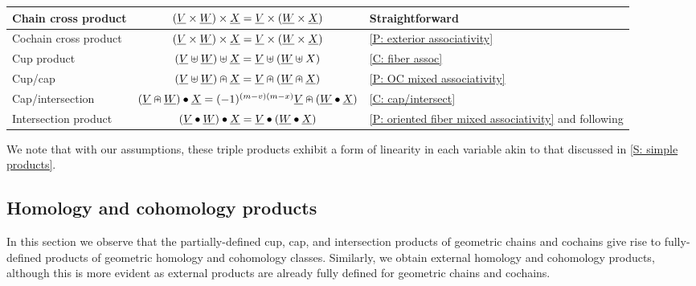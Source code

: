 \begin{center}
	\begin{tabular}{|l|c|l|}
		\hline
		Chain cross product& $(\underline{V} \times \underline{W}) \times \underline{X} = \underline{V} \times (\underline{W} \times \underline{X})$&Straightforward\\
		\hline
		Cochain cross product& $(\underline{V} \times \underline{W}) \times \underline{X} = \underline{V} \times (\underline{W} \times \underline{X})$&\cref{P: exterior associativity}\\
		\hline
		Cup product &$(\underline{V}\uplus \underline{W})\uplus\underline{X} = \underline{V}\uplus(\underline{W}\uplus X)$&\cref{C: fiber assoc} \\
		\hline
		Cup/cap & $(\underline{V} \uplus \underline{W})\nplus \underline{X} = \underline{V}\nplus(\underline{W}\nplus\underline{X})$& \cref{P: OC mixed associativity}\\
		\hline
		Cap/intersection &
		$ (\underline{V} \nplus \underline{W}) \bullet \underline{X} = (-1)^{(m-v)(m-x)}\underline{V} \nplus (\underline{W} \bullet \underline{X})$ &\cref{C: cap/intersect}\\
		\hline
		Intersection product &
		$(\underline{V}\bullet\underline{W})\bullet\underline{X} = \underline{V}\bullet(\underline{W}\bullet \underline{X})$&\cref{P: oriented fiber mixed associativity} and following\\
		\hline
	\end{tabular}
\end{center}

We note that with our assumptions, these triple products exhibit a form of linearity in each variable akin to that discussed in \cref{S: simple products}.


\subsection{Homology and cohomology products}\label{S: homology products}

In this section we observe that the partially-defined cup, cap, and intersection products of geometric chains and cochains give rise to fully-defined products of geometric homology and cohomology classes.
Similarly, we obtain external homology and cohomology products, although this is more evident as external products are already fully defined for geometric chains and cochains.

